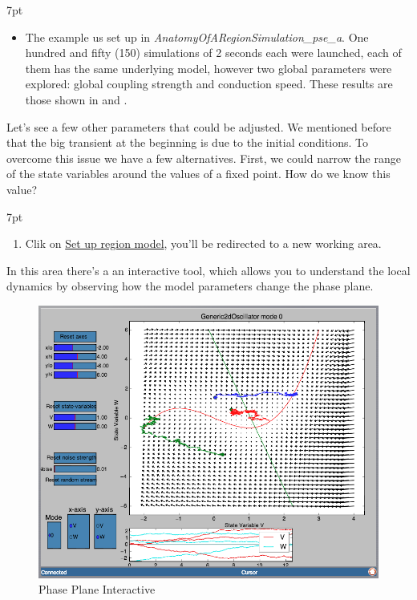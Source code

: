 \documentclass{tufte-handout}
\newenvironment{simulation}{%
  \def\FrameCommand{%
    \hspace{1pt}%
    {\color{ForestGreen}\vrule width 2pt}%
    {\color{simulationshade}\vrule width 4pt}%
    \colorbox{simulationshade}%
  }%
  \MakeFramed{\advance\hsize-\width\FrameRestore}%
  \noindent\hspace{-4.55pt}%
  \begin{adjustwidth}{}{7pt}%
  \vspace{2pt}\vspace{2pt}%
}
{%
  \vspace{2pt}\end{adjustwidth}\endMakeFramed%
}
\begin{document}
\begin{simulation}
\begin{itemize}
 \item The example us set up in \textit{AnatomyOfARegionSimulation\_pse\_a}. One hundred and fifty (150) simulations of 2 seconds each were launched, each of them has the same underlying model, however two global parameters were explored: global coupling strength and conduction speed. These results are those shown in \citep{Ghosh_2008} and \citep{Knock_2009}. 
\end{itemize}
\end{simulation}


Let's see a few other parameters that could be adjusted. We mentioned before
that the big transient at the beginning is due to the initial conditions. To
overcome this issue we have a few alternatives. First, we could narrow the range of the state variables around the values of a fixed point. How do we know this value?

\begin{simulation}
\begin{enumerate}
\item  Clik on \underline{Set up region model}, you'll be redirected to a new working area.
\end{enumerate}
\end{simulation}


In this area there's a an interactive tool, which allows you to understand the
local dynamics by observing how the model parameters change the phase
plane. 


\begin{figure}[h]
  \includegraphics[width=\linewidth]{Handout_UI_BuildingYourOwnBrainNetworkModel_PPI}%
  \caption{Phase Plane Interactive}%
  \label{fig:ppi}%
\end{figure}
\end{document}
